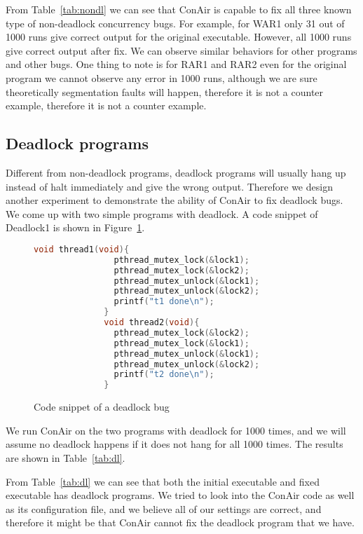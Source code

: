 

From Table~\ref{tab:nondl} we can see that ConAir is capable to fix all three
known type of non-deadlock concurrency bugs. For example, for WAR1 only 31 out
of 1000 runs give correct output for the original executable. However, all 1000
runs give correct output after fix. We can observe similar behaviors for other
programs and other bugs. One thing to note is for RAR1 and RAR2 even for the
original program we cannot observe any error in 1000 runs, although we are sure
theoretically segmentation faults will happen, therefore it is not a counter
example, therefore it is not a counter example.

\subsection{Deadlock programs}
Different from non-deadlock programs, deadlock programs will usually hang up
instead of halt immediately and give the wrong output. Therefore we design
another experiment to demonstrate the ability of ConAir to fix deadlock bugs.
We come up with two simple programs with deadlock. A code snippet of Deadlock1
is shown in Figure~\ref{fig:deadlock-code}.
\begin{figure}[htbp]
\begin{center}
\begin{lstlisting}[language=C]
              void thread1(void){
                pthread_mutex_lock(&lock1);
                pthread_mutex_lock(&lock2);
                pthread_mutex_unlock(&lock1);
                pthread_mutex_unlock(&lock2);
                printf("t1 done\n");
              }
              void thread2(void){
                pthread_mutex_lock(&lock2);
                pthread_mutex_lock(&lock1);
                pthread_mutex_unlock(&lock1);
                pthread_mutex_unlock(&lock2);
                printf("t2 done\n");
              }
\end{lstlisting}
\caption{Code snippet of a deadlock bug}
\end{center}
\label{fig:deadlock-code}
\end{figure}

We run ConAir on the two programs with deadlock for 1000 times, and we will
assume no deadlock happens if it does not hang for all 1000 times. The results
are shown in Table~\ref{tab:dl}.



From Table~\ref{tab:dl} we can see that both the initial executable and fixed
executable has deadlock programs. We tried to look into the ConAir code as well
as its configuration file, and we believe all of our settings are correct, and
therefore it might be that ConAir cannot fix the deadlock program that we have.

